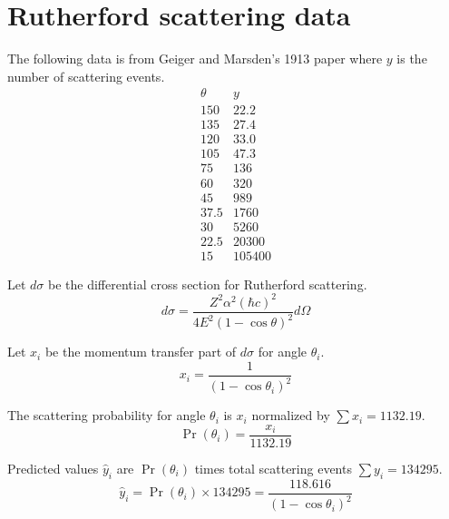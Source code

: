 

\section*{Rutherford scattering data}

The following data is from Geiger and Marsden's 1913 paper
where $y$ is the number of scattering events.
\begin{equation*}
\begin{matrix}
\theta & y\\
150 & 22.2\\
135 & 27.4\\
120 & 33.0\\
105 & 47.3\\
75 & 136\\
60 & 320\\
45 & 989\\
37.5 & 1760\\
30 & 5260\\
22.5 & 20300\\
15 & 105400
\end{matrix}
\end{equation*}

Let $d\sigma$ be the differential cross section for Rutherford scattering.
\begin{equation*}
d\sigma=\frac{Z^2\alpha^2(\hbar c)^2}{4E^2(1-\cos\theta)^2}d\Omega
\end{equation*}

Let $x_i$ be the momentum transfer part of $d\sigma$ for angle $\theta_i$.
\begin{equation*}
x_i=\frac{1}{(1-\cos\theta_i)^2}
\end{equation*}

The scattering probability for angle $\theta_i$ is $x_i$ normalized by $\sum x_i=1132.19$.
\begin{equation*}
\Pr(\theta_i)=\frac{x_i}{1132.19}
\end{equation*}

Predicted values $\hat y_i$ are $\Pr(\theta_i)$
times total scattering events $\sum y_i=134295$.
\begin{equation*}
\hat y_i=\Pr(\theta_i)\times134295=\frac{118.616}{(1-\cos\theta_i)^2}
\end{equation*}

